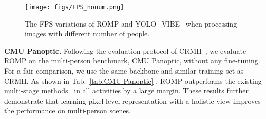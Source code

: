 \documentclass[10pt,twocolumn,letterpaper]{article}
\begin{document}
\begin{table}
	\begin{center}
		
	\end{center}
   \caption{{Comparisons to the state-of-the-art methods on the Crowdpose~\cite{crowdpose} benchmark.  The evaluation metric is .}}\label{tab:Crowdpose}
\end{table}


\begin{table}
	\begin{center}
	\end{center}
	\caption{{Run-time comparisons on a 1070Ti GPU. }}\label{tab:runtime comparison}
\end{table}

\begin{figure}[t]
	\centering
	\texttt{[image: figs/FPS\_nonum.png]}
	\caption{ The FPS variations of ROMP and YOLO+VIBE~\cite{kocabas2020vibe} when processing images with different number of people.}
	\label{fig:fps}
\end{figure}


\textbf{CMU Panoptic.} 
Following the evaluation protocol of CRMH~\cite{jiang2020coherent}, we evaluate ROMP on the multi-person benchmark, CMU Panoptic, without any fine-tuning.
For a fair comparison, we use the same backbone and similar training set as CRMH.
As shown in Tab.~\ref{tab:CMU Panoptic} , ROMP outperforms the existing multi-stage  methods~\cite{jiang2020coherent,zanfir2018monocular,zanfir2018deep} in all activities by a large margin.
These results further demonstrate that learning pixel-level representation with a holistic view improves the performance on multi-person scenes.
\end{document}
